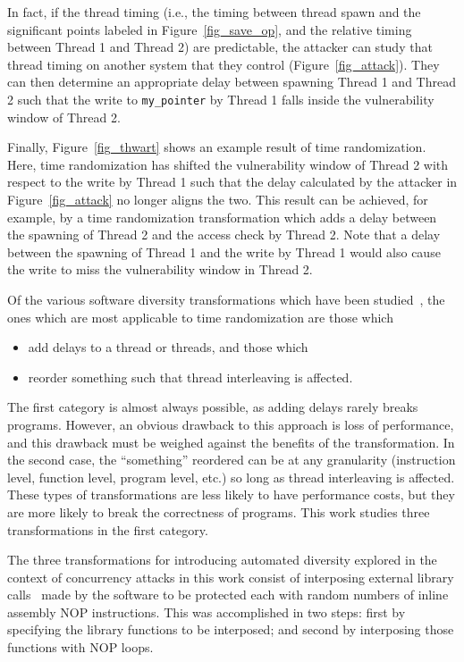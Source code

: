 In fact, if the thread timing (i.e., the timing between thread spawn and the significant points labeled in Figure~\ref{fig_save_op}, and the relative timing between Thread 1 and Thread 2) are predictable, the attacker can study that thread timing on another system that they control (Figure~\ref{fig_attack}).
They can then determine an appropriate delay between spawning Thread 1 and Thread 2 such that the write to \texttt{my\_pointer} by Thread 1 falls inside the vulnerability window of Thread 2.

Finally, Figure~\ref{fig_thwart} shows an example result of time randomization.
Here, time randomization has shifted the vulnerability window of Thread 2 with respect to the write by Thread 1 such that the delay calculated by the attacker in Figure~\ref{fig_attack} no longer aligns the two.
This result can be achieved, for example, by a time randomization transformation which adds a delay between the spawning of Thread 2 and the access check by Thread 2.
Note that a delay between the spawning of Thread 1 and the write by Thread 1 would also cause the write to miss the vulnerability window in Thread 2.

Of the various software diversity transformations which have been studied~\cite{Larsen2014}, the ones which are most applicable to time randomization are those which
\begin{itemize}
	\item add delays to a thread or threads, and those which
	\item reorder something such that thread interleaving is affected.
\end{itemize}
The first category is almost always possible, as adding delays rarely breaks programs.
However, an obvious drawback to this approach is loss of performance, and this drawback must be weighed against the benefits of the transformation.
In the second case, the ``something'' reordered can be at any granularity (instruction level, function level, program level, etc.) so long as thread interleaving is affected.
These types of transformations are less likely to have performance costs, but they are more likely to break the correctness of programs.
This work studies three transformations in the first category.

The three transformations for introducing automated diversity explored in the context of concurrency attacks in this work consist of interposing external library calls~\cite{Conrod2009} made by the software to be protected each with random numbers of inline assembly NOP instructions.
This was accomplished in two steps: first by specifying the library functions to be interposed; and second by interposing those functions with NOP loops.

